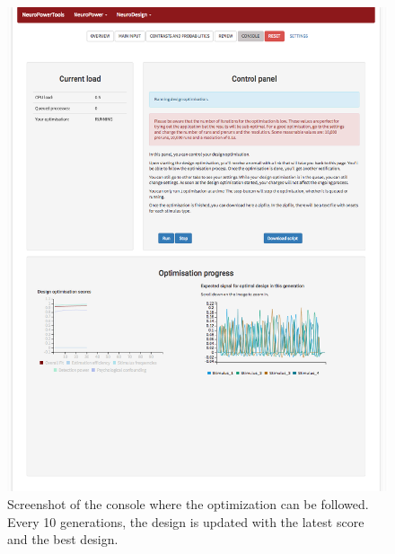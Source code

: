 \documentclass[article]{jss}
\begin{document}
\begin{figure}[t!]
\centering
\includegraphics{screenshot2.pdf}
\caption{Screenshot of the console where the optimization can be followed.  Every 10 generations, the design is updated with the latest score and the best design.\label{fig6}}
\end{figure}
%
\end{document}
